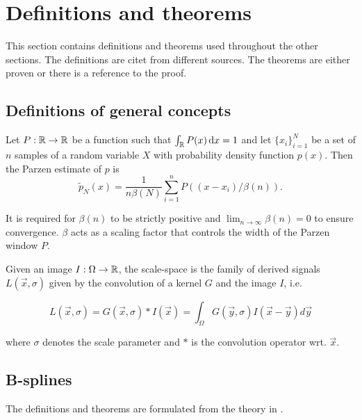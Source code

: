 
\chapter{Definitions and theorems}\label{chapter:defthm}

This section contains definitions and theorems used throughout the other sections. The definitions are citet from different sources. The theorems are either proven or there is a reference to the proof.\\

\section{Definitions of general concepts}
\begin{definition}\label{parzen}
Let $P:\mathbb R\to \mathbb R$ be a function such that $\int_\mathbb R P(x) \,{\rm d} x= 1$ and let $\{x_i\}_{i=1}^N$ be a set of $n$ samples of a random variable $X$ with probability density function $p(x)$. Then the Parzen estimate of $p$ is 
\begin{equation}
\tilde{p}_N(x) = \frac{1}{n\beta(N)}\sum_{i=1}^n P((x-x_i)/\beta(n)).
\end{equation}

It is required for $\beta(n)$ to be strictly positive and $\lim_{n\to\infty}\beta(n) = 0$ to ensure convergence. $\beta$ acts as a scaling factor that controls the width of the Parzen window $P$. \cite{the.00,parzen.62}
\end{definition}
\vspace{0.5cm}
\begin{definition}\label{scalespace}
Given an image $I:\Omega\to \mathbb R$, the scale-space is the family of derived signals $L(\vec{x},\sigma)$ given by the convolution of a kernel $G$ and the image $I$, i.e.

\begin{equation}
L(\vec{x},\sigma) = G(\vec{x},\sigma)*I(\vec{x}) = \int_{\Omega} G(\vec{y},\sigma)I(\vec{x}-\vec{y})d\vec{y}
\end{equation}

where $\sigma$ denotes the scale parameter and $*$ is the convolution operator wrt. $\vec{x}$.
\end{definition}

\section{B-splines}
The definitions and theorems are formulated from the theory in \cite[chap.~6.5]{kin.02}.\\

